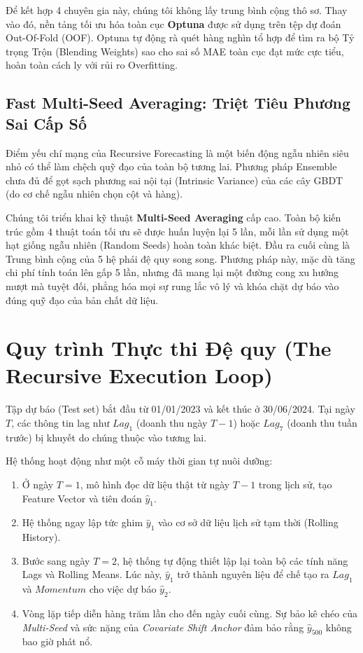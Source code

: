 \documentclass{article}
\begin{document}
Để kết hợp 4 chuyên gia này, chúng tôi không lấy trung bình cộng thô sơ. Thay vào đó, nền tảng tối ưu hóa toàn cục \textbf{Optuna} được sử dụng trên tệp dự đoán Out-Of-Fold (OOF). Optuna tự động rà quét hàng nghìn tổ hợp để tìm ra bộ Tỷ trọng Trộn (Blending Weights) sao cho sai số MAE toàn cục đạt mức cực tiểu, hoàn toàn cách ly với rủi ro Overfitting.

\subsection{Fast Multi-Seed Averaging: Triệt Tiêu Phương Sai Cấp Số}

Điểm yếu chí mạng của Recursive Forecasting là một biến động ngẫu nhiên siêu nhỏ có thể làm chệch quỹ đạo của toàn bộ tương lai. Phương pháp Ensemble chưa đủ để gọt sạch phương sai nội tại (Intrinsic Variance) của các cây GBDT (do cơ chế ngẫu nhiên chọn cột và hàng).

Chúng tôi triển khai kỹ thuật \textbf{Multi-Seed Averaging} cấp cao. Toàn bộ kiến trúc gồm 4 thuật toán tối ưu sẽ được huấn luyện lại 5 lần, mỗi lần sử dụng một hạt giống ngẫu nhiên (Random Seeds) hoàn toàn khác biệt. Đầu ra cuối cùng là Trung bình cộng của 5 hệ phái đệ quy song song. 
Phương pháp này, mặc dù tăng chi phí tính toán lên gấp 5 lần, nhưng đã mang lại một đường cong xu hướng mượt mà tuyệt đối, phẳng hóa mọi sự rung lắc vô lý và khóa chặt dự báo vào đúng quỹ đạo của bản chất dữ liệu.

\section{Quy trình Thực thi Đệ quy (The Recursive Execution Loop)}

Tập dự báo (Test set) bắt đầu từ 01/01/2023 và kết thúc ở 30/06/2024. Tại ngày $T$, các thông tin lag như $Lag_1$ (doanh thu ngày $T-1$) hoặc $Lag_7$ (doanh thu tuần trước) bị khuyết do chúng thuộc vào tương lai.

Hệ thống hoạt động như một cỗ máy thời gian tự nuôi dưỡng:
\begin{enumerate}
    \item Ở ngày $T=1$, mô hình đọc dữ liệu thật từ ngày $T-1$ trong lịch sử, tạo Feature Vector và tiên đoán $\hat{y}_1$.
    \item Hệ thống ngay lập tức ghim $\hat{y}_1$ vào cơ sở dữ liệu lịch sử tạm thời (Rolling History).
    \item Bước sang ngày $T=2$, hệ thống tự động thiết lập lại toàn bộ các tính năng Lags và Rolling Means. Lúc này, $\hat{y}_1$ trở thành nguyên liệu để chế tạo ra $Lag_1$ và $Momentum$ cho việc dự báo $\hat{y}_2$.
    \item Vòng lặp tiếp diễn hàng trăm lần cho đến ngày cuối cùng. Sự bảo kê chéo của \textit{Multi-Seed} và sức nặng của \textit{Covariate Shift Anchor} đảm bảo rằng $\hat{y}_{500}$ không bao giờ phát nổ.
\end{enumerate}
\end{document}
